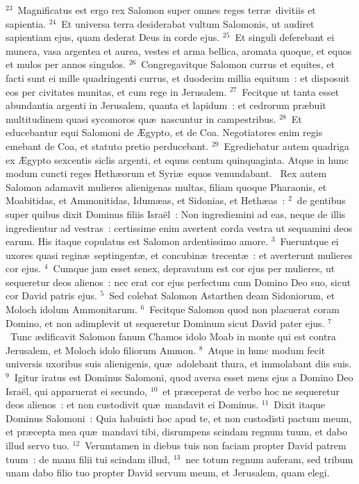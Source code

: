 ${}^{23}$~Magnificatus est ergo rex Salomon super omnes reges terr\ae\ divitiis et sapientia.
${}^{24}$~Et universa terra desiderabat vultum Salomonis, ut audiret sapientiam ejus, quam dederat Deus in corde ejus.
${}^{25}$~Et singuli deferebant ei munera, vasa argentea et aurea, vestes et arma bellica, aromata quoque, et equos et mulos per annos singulos.
${}^{26}$~Congregavitque Salomon currus et equites, et facti sunt ei mille quadringenti currus, et duodecim millia equitum~: et disposuit eos per civitates munitas, et cum rege in Jerusalem.
${}^{27}$~Fecitque ut tanta esset abundantia argenti in Jerusalem, quanta et lapidum~: et cedrorum pr\ae buit multitudinem quasi sycomoros qu\ae\ nascuntur in campestribus.
${}^{28}$~Et educebantur equi Salomoni de \AE gypto, et de Coa. Negotiatores enim regis emebant de Coa, et statuto pretio perducebant.
${}^{29}$~Egrediebatur autem quadriga ex \AE gypto sexcentis siclis argenti, et equus centum quinquaginta. Atque in hunc modum cuncti reges Heth\ae orum et Syri\ae\ equos venundabant.
~\lettrine[lines=10,image=true,loversize=0.05,lraise=-0.03]{R}{}ex autem Salomon adamavit mulieres alienigenas multas, filiam quoque Pharaonis, et Moabitidas, et Ammonitidas, Idum\ae as, et Sidonias, et Heth\ae as~:
${}^{2}$~de gentibus super quibus dixit Dominus filiis Isra\"el~: Non ingrediemini ad eas, neque de illis ingredientur ad vestras~: certissime enim avertent corda vestra ut sequamini deos earum. His itaque copulatus est Salomon ardentissimo amore.
${}^{3}$~Fueruntque ei uxores quasi regin\ae\ septingent\ae , et concubin\ae\ trecent\ae~: et averterunt mulieres cor ejus.
${}^{4}$~Cumque jam esset senex, depravatum est cor ejus per mulieres, ut sequeretur deos alienos~: nec erat cor ejus perfectum cum Domino Deo suo, sicut cor David patris ejus.
${}^{5}$~Sed colebat Salomon Astarthen deam Sidoniorum, et Moloch idolum Ammonitarum.
${}^{6}$~Fecitque Salomon quod non placuerat coram Domino, et non adimplevit ut sequeretur Dominum sicut David pater ejus.
${}^{7}$~Tunc \ae dificavit Salomon fanum Chamos idolo Moab in monte qui est contra Jerusalem, et Moloch idolo filiorum Ammon.
${}^{8}$~Atque in hunc modum fecit universis uxoribus suis alienigenis, qu\ae\ adolebant thura, et immolabant diis suis.
${}^{9}$~Igitur iratus est Dominus Salomoni, quod aversa esset mens ejus a Domino Deo Isra\"el, qui apparuerat ei secundo,
${}^{10}$~et pr\ae ceperat de verbo hoc ne sequeretur deos alienos~: et non custodivit qu\ae\ mandavit ei Dominus.
${}^{11}$~Dixit itaque Dominus Salomoni~: Quia habuisti hoc apud te, et non custodisti pactum meum, et pr\ae cepta mea qu\ae\ mandavi tibi, disrumpens scindam regnum tuum, et dabo illud servo tuo.
${}^{12}$~Verumtamen in diebus tuis non faciam propter David patrem tuum~: de manu filii tui scindam illud,
${}^{13}$~nec totum regnum auferam, sed tribum unam dabo filio tuo propter David servum meum, et Jerusalem, quam elegi.


